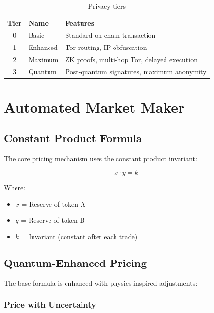 \documentclass[11pt,a4paper]{article}
\begin{document}
\begin{table}[H]
\centering
\begin{tabular}{clp{7cm}}
\toprule
\textbf{Tier} & \textbf{Name} & \textbf{Features} \\
\midrule
0 & Basic & Standard on-chain transaction \\
1 & Enhanced & Tor routing, IP obfuscation \\
2 & Maximum & ZK proofs, multi-hop Tor, delayed execution \\
3 & Quantum & Post-quantum signatures, maximum anonymity \\
\bottomrule
\end{tabular}
\caption{Privacy tiers}
\end{table}

\section{Automated Market Maker}

\subsection{Constant Product Formula}

The core pricing mechanism uses the constant product invariant:

\begin{equation}
x \cdot y = k
\end{equation}

Where:
\begin{itemize}[leftmargin=*]
    \item $x$ = Reserve of token A
    \item $y$ = Reserve of token B
    \item $k$ = Invariant (constant after each trade)
\end{itemize}

\subsection{Quantum-Enhanced Pricing}

The base formula is enhanced with physics-inspired adjustments:

\subsubsection{Price with Uncertainty}
\end{document}
